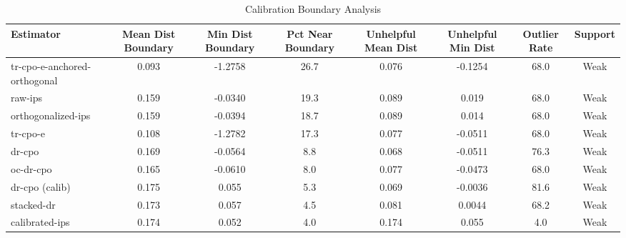 \begin{table}[htbp]
\centering
\caption{Calibration Boundary Analysis}
\label{tab:A5}
\begin{tabular}{l|ccccccc}
\toprule
Estimator & Mean Dist Boundary & Min Dist Boundary & Pct Near Boundary & Unhelpful Mean Dist & Unhelpful Min Dist & Outlier Rate & Support \\
\midrule
tr-cpo-e-anchored-orthogonal & 0.093 & -1.2758 & 26.7 & 0.076 & -0.1254 & 68.0 & Weak \\
raw-ips & 0.159 & -0.0340 & 19.3 & 0.089 & 0.019 & 68.0 & Weak \\
orthogonalized-ips & 0.159 & -0.0394 & 18.7 & 0.089 & 0.014 & 68.0 & Weak \\
tr-cpo-e & 0.108 & -1.2782 & 17.3 & 0.077 & -0.0511 & 68.0 & Weak \\
dr-cpo & 0.169 & -0.0564 & 8.8 & 0.068 & -0.0511 & 76.3 & Weak \\
oc-dr-cpo & 0.165 & -0.0610 & 8.0 & 0.077 & -0.0473 & 68.0 & Weak \\
dr-cpo (calib) & 0.175 & 0.055 & 5.3 & 0.069 & -0.0036 & 81.6 & Weak \\
stacked-dr & 0.173 & 0.057 & 4.5 & 0.081 & 0.0044 & 68.2 & Weak \\
calibrated-ips & 0.174 & 0.052 & 4.0 & 0.174 & 0.055 & 4.0 & Weak \\
\bottomrule
\end{tabular}
\end{table}